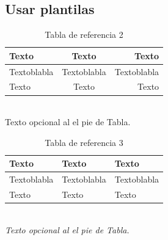 \subsection{Usar plantilas}
\begin{minipage}[H]{0.49\textwidth}
    \begin{table}[H]
        \centering
        \caption{Tabla de referencia 2}
        \begin{tabular}{| l | c | r |} 
        \hline
            \textbf{Texto} & \textbf{Texto} & \textbf{Texto} \\ \hline
            Textoblabla    & Textoblabla   & Textoblabla \\ \hline
            Texto    & Texto   & Texto \\ \hline
        \end{tabular}
        \\ \scriptsize{Texto opcional al el pie de Tabla.}
    \end{table}
\end{minipage}
\begin{minipage}[H]{0.49\textwidth}
    \begin{table}[H]
        \centering
        \caption{Tabla de referencia 3}
        \begin{tabular}{l l l}
        \toprule
            \textbf{Texto} & \textbf{Texto} & \textbf{Texto} \\
            \midrule
            Textoblabla    & Textoblabla   & Textoblabla \\
            Texto    & Texto   & Texto \\
            \bottomrule
        \end{tabular}
        \\ \textit{\scriptsize{Texto opcional al el pie de Tabla.}}
    \end{table}
\end{minipage}